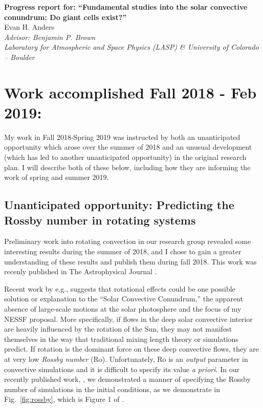 \documentclass[aasms,12pt]{article}
\begin{document}
\begin{center}
   \large\textbf{Progress report for: ``Fundamental studies into the solar convective conundrum: Do giant cells exist?''}\\
   \vspace{0.2cm}
   \large{Evan H. Anders}\\
   \vspace{0.2cm}
   \normalsize\textit{Advisor: Benjamin P. Brown}\\
   \normalsize\textit{Laboratory for Atmospheric and Space Physics (LASP) \& University of Colorado -- Boulder}\\
\end{center}

\vspace{-0.6cm}
\section{Work accomplished Fall 2018 - Feb 2019:}
My work in Fall 2018-Spring 2019 was instructed by both an unanticipated opportunity which arose over the
summer of 2018 and an unusual development (which has led to another unanticipated opportunity)
in the original research plan. I will describe both 
of these below, including how they are informing the work of spring and summer 2019.

\subsection{Unanticipated opportunity: Predicting the Rossby number in rotating systems}
Preliminary work into rotating convection in our research group revealed some interesting results
during the summer of 2018, and I chose to gain a greater understanding of these results and
publish them during fall 2018. This work was recenly published in 
The Astrophysical Journal \citep{anders&all2019}.

Recent work by e.g., \citet{featherstone&hindman2016} suggests that rotational effects could be
one possible solution or explanation
to the ``Solar Convective Conundrum,'' the apparent absence of large-scale motions at the
solar photosphere and the focus of my NESSF proposal. More specifically, if flows
in the deep solar convective interior are heavily influenced by the rotation of the Sun, they
may not manifest themselves in the way that traditional mixing length theory or simulations
predict. If rotation is the dominant force on these deep convective flows, they are
at very low \emph{Rossby number} (Ro). Unfortunately, Ro is an \emph{output} parameter
in convective simulations and it is difficult to specify its value \emph{a priori}.
In our recently published work, \citet{anders&all2019}, 
we demonstrated a manner of specifying the Rossby number of simulations in the initial
conditions, as we demonstrate in Fig.~\ref{fig:rossby}, which is Figure 1 of 
\citet{anders&all2019}.
\end{document}
